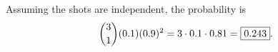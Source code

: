 Assuming the shots are independent, the probability is
\[\dbinom31(0.1)(0.9)^2=3\cdot0.1\cdot0.81=\boxed{0.243}.\]
